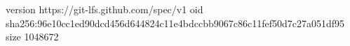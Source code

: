 version https://git-lfs.github.com/spec/v1
oid sha256:96e10cc1ed90dcd456d644824c11e4bdccbb9067c86c11fef50d7c27a051df95
size 1048672
